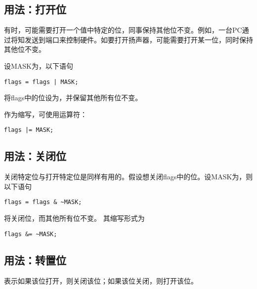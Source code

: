 \subsection{用法：打开位}
\begin{frame}
  有时，可能需要打开一个值中特定的位，同事保持其他位不变。例如，一台PC通过将知发送到端口来控制硬件。如要打开扬声器，可能需要打开某一位，同时保持其他位不变。
\end{frame}

\begin{frame}[fragile]
  \begin{li}
    设{\tf MASK}为{}，以下语句
    \begin{lstlisting}[backgroundcolor=\color{red!20}]
      flags = flags | MASK;
    \end{lstlisting}
    将{\tf flags}中的位{}设为{}，并保留其他所有位不变。

    \pause \vspace{.1in}

    作为缩写，可使用运算符：
    \begin{lstlisting}[backgroundcolor=\color{red!20}]
      flags |= MASK;
    \end{lstlisting}
  \end{li}
\end{frame}

\subsection{用法：关闭位}
\begin{frame}[fragile]
  关闭特定位与打开特定位是同样有用的。假设想关闭{\tf flags}中的位{}。设{\tf MASK}为{}，则以下语句
  \begin{lstlisting}[backgroundcolor=\color{red!20}]
    flags = flags & ~MASK;
  \end{lstlisting}
  将关闭位{}，而其他所有位不变。 其缩写形式为
  \begin{lstlisting}[backgroundcolor=\color{red!20}]
    flags &= ~MASK;
  \end{lstlisting}
\end{frame}

\subsection{用法：转置位}
\begin{frame}
  表示如果该位打开，则关闭该位；如果该位关闭，则打开该位。
\end{frame}

